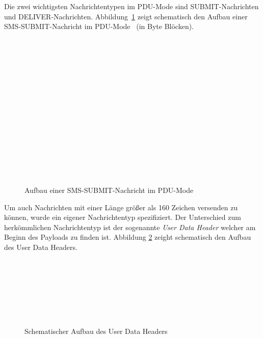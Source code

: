 \documentclass[paper=a4, fontsize=11pt]{scrartcl}
\begin{document}
Die zwei wichtigsten Nachrichtentypen im PDU-Mode sind SUBMIT-Nachrichten und DELIVER-Nachrichten.
Abbildung~\ref{fig:pdu} zeigt schematisch den Aufbau einer SMS-SUBMIT-Nachricht im PDU-Mode~\cite{pdu-mode} (in Byte Blöcken).
\begin{figure}[H]
	\begin{bytefield}[bitwidth=\textwidth/8]{8}
		\\
		\\
		\\
		\\
		\\
		 \\
		\skippedwords \\
		 \\
		\\
		\\
		\\
		 \\
		\skippedwords \\
		 \\
	\end{bytefield}
	\caption{Aufbau einer SMS-SUBMIT-Nachricht im PDU-Mode}
	\label{fig:pdu}
\end{figure}

Um auch Nachrichten mit einer Länge größer als 160 Zeichen versenden zu können, 
wurde ein eigener Nachrichtentyp spezifiziert. Der Unterschied zum
herkömmlichen Nachrichtentyp ist der sogenannte \textit{User Data Header} welcher am
Beginn des Payloads zu finden ist. Abbildung \ref{fig:gsm-udh} zeight schematisch den
Aufbau des User Data Headers.\\
\begin{figure}[H]
	\begin{bytefield}[bitwidth=\textwidth/8]{8}
		 \\
		 \\
		 \\
		 \\
		 \\
		 \\
	\end{bytefield}
	\caption{Schematischer Aufbau des User Data Headers}
	\label{fig:gsm-udh}
\end{figure}
\end{document}
